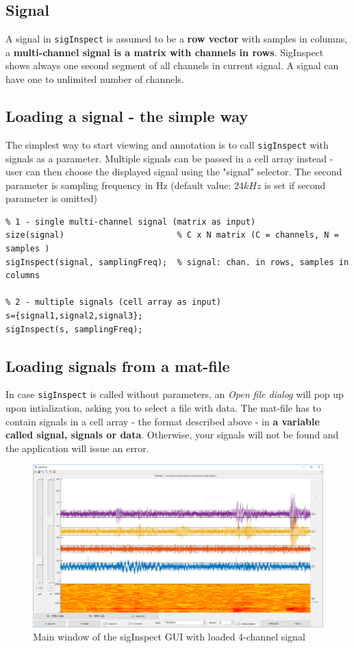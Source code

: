 \documentclass[a4paper,10pt]{article}
\begin{document}
\subsection{Signal}
A signal in \verb|sigInspect| is assumed to be a \textbf{row vector} with samples in columns, a \textbf{multi-channel signal is a matrix with channels in rows}. SigInspect shows always one second segment of all channels in current signal. A signal can have one to unlimited number of channels.

\subsection{Loading a signal - the simple way}
The simplest way to start viewing and annotation is to call \verb|sigInspect| with signals as a parameter. Multiple signals can be passed in a cell array instead - user can then choose the displayed signal using the "signal" selector. The second parameter is sampling frequency in Hz (default value: $24 kHz$ is set if second parameter is omitted)
\begin{lstlisting} 
% 1 - single multi-channel signal (matrix as input)
size(signal)					   % C x N matrix (C = channels, N = samples )
sigInspect(signal, samplingFreq);  % signal: chan. in rows, samples in columns

% 2 - multiple signals (cell array as input) 
s={signal1,signal2,signal3}; 
sigInspect(s, samplingFreq); 
\end{lstlisting}

\subsection{Loading signals from a mat-file}
In case \verb|sigInspect| is called without parameters, an \emph{Open file dialog} will pop up upon intialization, asking you to select a  file with data. The mat-file has to contain signals in a cell array - the format described above - in \textbf{a variable called signal, signals or data}. Otherwise, your signals will not be found and the application will issue an error.

\begin{figure} [htb]
\centering
\includegraphics[width=1\textwidth]{sigInspectExploratory.png} 
\caption{Main window of the sigInspect GUI with loaded 4-channel signal}
\label{fig:sigInspectMainWindow}
\end{figure}
\end{document}
